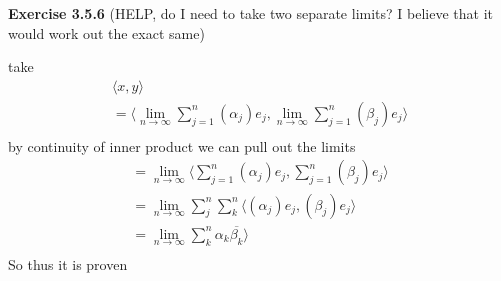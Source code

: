 \documentclass[12pt]{article}
\newenvironment{exercise}[1]{\vspace{.1in}\noindent\textbf{Exercise #1 \hspace{.05em}}}{}
\theoremstyle{definition}
\theoremstyle{remark}
\begin{document}
\begin{exercise}{3.5.6} (HELP, do I need to take two separate limits? I believe that it would work out the exact same)

	take
	\begin{align}
		\langle x,y\rangle                                                                                                                                                \\
		=\langle \lim_{n \rightarrow \infty}\sum\limits_{j=1}^{n}\left(\alpha_j\right)e_j, \lim_{n \rightarrow \infty}\sum\limits_{j=1}^{n}\left(\beta_j\right)e_j\rangle \\
	\end{align}
	by continuity of inner product we can pull out the limits
	\begin{align}
		=\lim_{n \rightarrow \infty}\langle \sum\limits_{j=1}^{n}\left(\alpha_j\right)e_j, \sum\limits_{j=1}^{n}\left(\beta_j\right)e_j\rangle \\
		=\lim_{n \rightarrow \infty}\sum_j^n\sum_k^n\langle \left(\alpha_j\right)e_j, \left(\beta_j\right)e_j\rangle                           \\
		=\lim_{n \rightarrow \infty}\sum_k^n\alpha_k \overline{\beta_k}\rangle                                                                 \\
	\end{align}
	So thus it is proven
\end{exercise}
\end{document}
